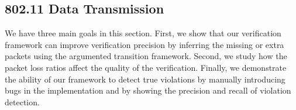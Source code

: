 \subsection{802.11 Data Transmission}
\label{subsec:tx}

%
We have three main goals in this section.  First, we show that our
verification framework can improve verification precision by inferring
the missing or extra packets using the argumented transition
framework.
%
Second, we study how the packet loss ratios affect the quality of the
verification.
%
Finally, we demonstrate the ability of our framework to detect true violations by manually introducing bugs in the \ns{} implementation and by showing the
precision and recall of violation detection.


